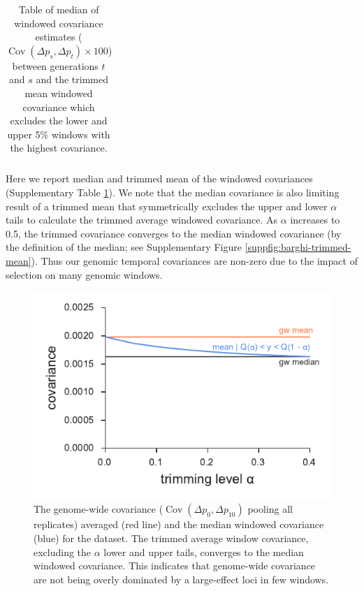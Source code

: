 \documentclass[11pt]{article}
\DeclareMathOperator{\cov}{Cov}
\begin{document}
{\begin{table}
\begin{tabular}{l c c c c c c}
   \end{tabular}
   \caption{Table of median of windowed covariance estimates ($\cov(\Delta p_s,
     \Delta p_t) \times 100$) between generations $t$ and $s$ and the trimmed
     mean windowed covariance which excludes the lower and upper 5\% windows
     with the highest covariance.}
  \label{supp:table-trimmed-mean}

\end{table}



Here we report median and trimmed mean of the windowed covariances
(Supplementary Table \ref{supp:table-trimmed-mean}). We note that the median
covariance is also limiting result of a trimmed mean that symmetrically
excludes the upper and lower $\alpha$ tails to calculate the trimmed average
windowed covariance. As $\alpha$ increases to 0.5, the trimmed covariance
converges to the median windowed covariance (by the definition of the median;
see Supplementary Figure \ref{suppfig:barghi-trimmed-mean}). Thus our genomic
temporal covariances are non-zero due to the impact of selection on many
genomic windows.  


\begin{figure}[!ht]
  \centering
  \includegraphics[]{figures/barghi-trimmed-mean.pdf}

  \caption{The genome-wide covariance ($\cov(\Delta p_0, \Delta p_10)$ pooling
    all replicates) averaged (red line) and the median windowed covariance
    (blue) for the \textcite{Barghi2019-qy} dataset. The trimmed average window
    covariance, excluding the $\alpha$ lower and upper tails, converges to the
     median windowed covariance. This indicates that genome-wide covariance are
     not being overly dominated by a large-effect loci in few windows.}


\end{figure}}
\end{document}
